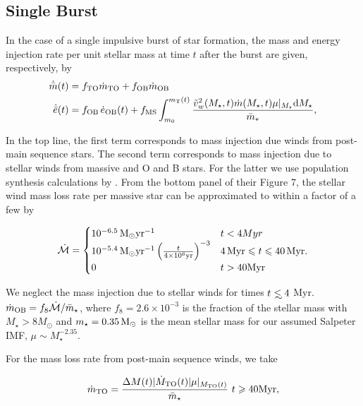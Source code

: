 
\subsection{Single Burst}

In the case of a single impulsive burst of star formation, the mass
and energy injection rate per unit stellar mass at time $t$ after the
burst are given, respectively, by
\begin{align} 
  \dot{\bar{m}}(t) &= f_{\rm TO} \dot{m}_{\rm TO} + f_{\rm OB}
  \dot{m}_{\rm OB}\\
\dot{\bar{e}}(t) &=f_{\rm OB} \, \dot{e}_{\rm OB}(t)+ f_{\rm MS}
\int_{m_0}^{m_{\rm T}(t)} \frac{\vw^2(\Mstar, t) \dot{m}(\Mstar, t)
  \mu|_{\Mstar} {\rm d}\Mstar}{\bar{m}_*},
  \label{eq:edotImp}
\end{align} 

In the top line, the first term corresponds to mass injection due
winds from post-main sequence stars. The second term corresponds to
mass injection due to stellar winds from massive and O and B
stars. For the latter we use population synthesis calculations by
\citet{VossDiehl+:2009a}. From the bottom panel of their Figure 7, the
stellar wind mass loss rate per massive star can be approximated to within
a factor of a few by

\begin{equation}
\dot{\mathcal{M}}=
\begin{cases}
10^{-6.5} \Msun {\rm yr^{-1}} & t < 4 Myr\\
10^{-5.4} \Msun {\rm yr^{-1}} \left(\frac{t}{4\times 10^6 {\rm
       yr}}\right)^{-3} & 4 {\, \rm Myr} \leq t \leq 40 {\, \rm Myr}. \\
0 & t>40 {\rm Myr}
\end{cases}
\end{equation}

We neglect the mass injection due to stellar winds for times $t\lsim
4$ Myr. $\dot{m}_{\rm OB}=f_{8} \dot{\mathcal{M}}/\bar{m}_{\star}$,
where $f_{8} =2.6 \times 10^{-3}$ is the fraction of the stellar mass
with $M_{\star} > 8M_{\odot}$ and $m_{\star}=0.35 \Msun$ is the mean
stellar mass for our assumed Salpeter IMF, $\mu\sim M_\star^{-2.35}$.



For the mass loss rate from post-main sequence winds, we take

\begin{equation}
  \dot{m}_{\rm TO}=\frac{\Delta M(t) |\dot{M}_{\rm TO}(t)|
    \mu|_{M_{\rm TO}(t)}}{\bar{m}_{\star}}  \,\,  t \geq {\rm 40 Myr},
\end{equation}

